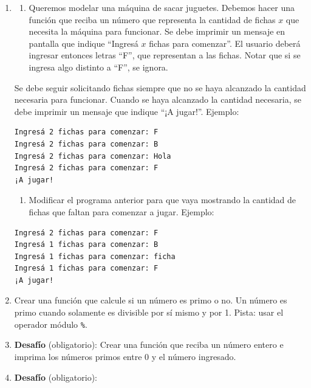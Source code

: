 \documentclass[
  letterpaper,
  DIV=11,
  numbers=noendperiod]{scrreprt}
\providecommand{\tightlist}{%
  \setlength{\itemsep}{0pt}\setlength{\parskip}{0pt}}\usepackage{longtable,booktabs,array}
\begin{document}
\begin{enumerate}
\def\labelenumi{\arabic{enumi}.}
\setcounter{enumi}{7}
\item
  \begin{enumerate}
  \def\labelenumii{\alph{enumii}.}
  \tightlist
  \item
    Queremos modelar una máquina de sacar juguetes. Debemos hacer una
    función que reciba un número que representa la cantidad de fichas
    \(x\) que necesita la máquina para funcionar. Se debe imprimir un
    mensaje en pantalla que indique ``Ingresá \(x\) fichas para
    comenzar''. El usuario deberá ingresar entonces letras ``F'', que
    representan a las fichas. Notar que si se ingresa algo distinto a
    ``F'', se ignora.
  \end{enumerate}

  Se debe seguir solicitando fichas siempre que no se haya alcanzado la
  cantidad necesaria para funcionar. Cuando se haya alcanzado la
  cantidad necesaria, se debe imprimir un mensaje que indique ``¡A
  jugar!''. Ejemplo:

\begin{verbatim}
Ingresá 2 fichas para comenzar: F
Ingresá 2 fichas para comenzar: B
Ingresá 2 fichas para comenzar: Hola
Ingresá 2 fichas para comenzar: F
¡A jugar!
\end{verbatim}

  \begin{enumerate}
  \def\labelenumii{\alph{enumii}.}
  \setcounter{enumii}{1}
  \tightlist
  \item
    Modificar el programa anterior para que vaya mostrando la cantidad
    de fichas que faltan para comenzar a jugar. Ejemplo:
  \end{enumerate}

\begin{verbatim}
Ingresá 2 fichas para comenzar: F
Ingresá 1 fichas para comenzar: B
Ingresá 1 fichas para comenzar: ficha
Ingresá 1 fichas para comenzar: F
¡A jugar!
\end{verbatim}
\item
  Crear una función que calcule si un número es primo o no. Un número es
  primo cuando solamente es divisible por sí mismo y por 1. Pista: usar
  el operador módulo \texttt{\%}.
\item
  \textbf{Desafío} (obligatorio): Crear una función que reciba un número
  entero e imprima los números primos entre 0 y el número ingresado.
\item
  \textbf{Desafío} (obligatorio):


\end{enumerate}
\end{document}

